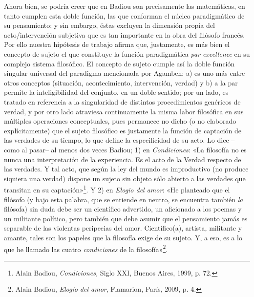 Ahora bien, se podría creer que en Badiou son precisamente las matemáticas, en tanto cumplen esta doble función, las que conforman el núcleo paradigmático de su pensamiento; y sin embargo, éstas excluyen la dimensión propia del acto/intervención subjetiva que es tan importante en la obra del filósofo francés. Por ello nuestra hipótesis de trabajo afirma que, justamente, es más bien el concepto de sujeto el que constituye la función paradigmática \emph{par excellence} en su complejo sistema filosófico. El concepto de sujeto cumple así la doble función singular-universal del paradigma mencionada por Agamben: a) es uno más entre otros conceptos (situación, acontecimiento, intervención, verdad) y b) a la par permite la inteligibilidad del conjunto, en un doble sentido; por un lado, es tratado en referencia a la singularidad de distintos procedimientos genéricos de verdad, y por otro lado atraviesa continuamente la misma labor filosófica en sus múltiples operaciones conceptuales, pues permanece no dicho (o no elaborado explícitamente) que el sujeto filosófico es justamente la función de captación de las verdades de su tiempo, lo que define la especificidad de su acto. Lo dice --como al pasar-- al menos dos veces Badiou; 1) en \emph{Condiciones}: «La filosofía no es nunca una interpretación de la experiencia. Es el acto de la Verdad respecto de las verdades. Y tal acto, que según la ley del mundo es improductivo (no produce siquiera una verdad) dispone un sujeto sin objeto sólo abierto a las verdades que transitan en su captación»\footnote{Alain Badiou, \emph{Condiciones,} Siglo XXI, Buenos Aires, 1999, p. 72.}. Y 2) en \emph{Elogio del amor}: «He planteado que el filósofo (y bajo esta palabra, que se entiende en neutro, se encuentra también \emph{la} filósofa) sin duda debe ser un científico advertido, un aficionado a los poemas y un militante político, pero también que debe asumir que el pensamiento jamás es separable de las violentas peripecias del amor. Científico(a), artista, militante y amante, tales son los papeles que la filosofía exige de su sujeto. Y, a eso, es a lo que he llamado las cuatro \emph{condiciones} de la filosofía»\footnote{Alain Badiou, \emph{Elogio del amor}, Flamarion, París, 2009, p. 4.}.

